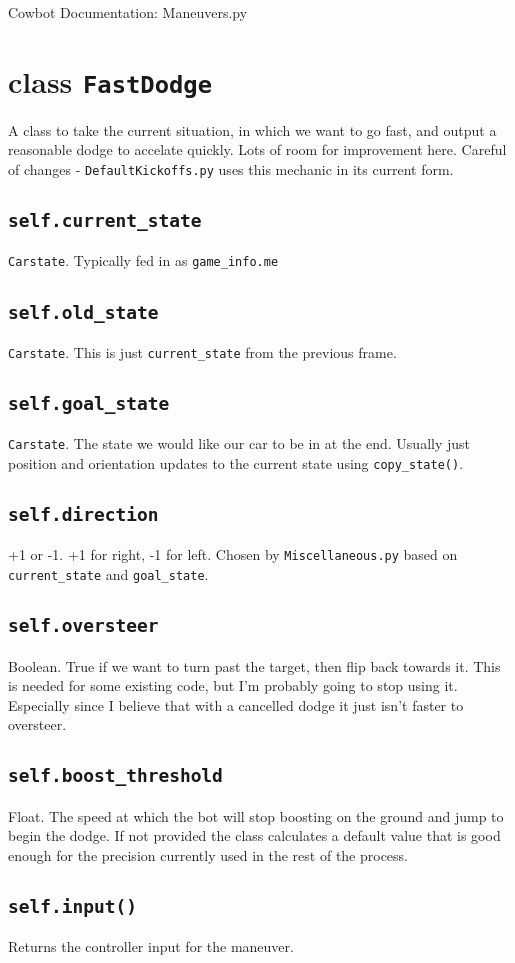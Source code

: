 \documentclass{article}
\newcommand{\class}[1]{\section{class \texttt{#1}}}
\newcommand{\attribute}[1]{\subsection{\texttt{self.#1}}}
\newcommand{\method}[1]{\subsection{\texttt{self.#1}}}
\begin{document}
\begin{flushleft}

\begin{center}
  Cowbot Documentation: Maneuvers.py
\end{center}



\class{FastDodge}
      {

        A class to take the current situation, in which we want to go fast, and output a reasonable dodge to accelate quickly.  Lots of room for improvement here.  Careful of changes - \texttt{DefaultKickoffs.py} uses this mechanic in its current form. 


        \attribute{current\_state}
                  {
                    \texttt{Carstate}.  Typically fed in as \texttt{game\_info.me}
                  }
        \attribute{old\_state}
                  {
                    \texttt{Carstate}.  This is just \texttt{current\_state} from the previous frame.
                  }
        \attribute{goal\_state}
                  {
                    \texttt{Carstate}.  The state we would like our car to be in at the end.  Usually just position and orientation updates to the current state using \texttt{copy\_state()}.
                  }

        \attribute{direction}
                  {
                    +1 or -1.  +1 for right, -1 for left.  Chosen by \texttt{Miscellaneous.py} based on \texttt{current\_state} and \texttt{goal\_state}.
                  }

        \attribute{oversteer}
                  {
                    Boolean.  True if we want to turn past the target, then flip back towards it.  This is needed for some existing code, but I'm probably going to stop using it.  Especially since I believe that with a cancelled dodge it just isn't faster to oversteer.
                  }

        \attribute{boost\_threshold}
                  {
                    Float.  The speed at which the bot will stop boosting on the ground and jump to begin the dodge.  If not provided the class calculates a default value that is good enough for the precision currently used in the rest of the process.
                  }

        \method{input()}
               {
                 Returns the controller input for the maneuver.
               }

      }
      





\end{flushleft}
\end{document}
